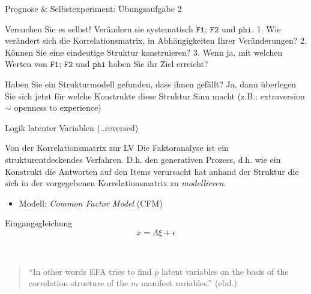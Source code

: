 \documentclass[
  ignorenonframetext,
]{beamer}
\providecommand{\tightlist}{%
  \setlength{\itemsep}{0pt}\setlength{\parskip}{0pt}}
\begin{document}
\begin{frame}{Prognose \& Selbstexperiment: Übungsaufgabe 2}
\protect\hypertarget{prognose-selbstexperiment-uxfcbungsaufgabe-2}{}
\begin{example}
Versuchen Sie es selbst! Verändern sie systematisch $\texttt{F1; F2}$  und
$\texttt{phi}$.
1. Wie verändert sich die Korrelationsmatrix, in Abhängigkeiten
Ihrer Veränderungen? 
2. Können Sie eine eindeutige Struktur konstruieren? 
3. Wenn ja, mit welchen Werten von $\texttt{F1; F2}$  und $\texttt{phi}$ haben Sie ihr Ziel
erreicht?
\end{example}

\begin{example}
Haben Sie ein Strukturmodell gefunden, dass ihnen gefällt? Ja, dann überlegen
Sie sich jetzt für welche Konstrukte diese Struktur Sinn macht (z.B.:
extraversion $\sim$ openness to experience)
\end{example}
\end{frame}

\begin{frame}{Logik latenter Variablen (..reversed)}
\protect\hypertarget{logik-latenter-variablen-..reversed}{}
\begin{block}{Von der Korrelationsmatrix zur LV} Die Faktoranalyse
ist ein strukturentdeckendes Verfahren. D.h. den generativen Prozess, d.h. wie
ein Konstrukt die Antworten auf den Items verursacht hat anhand der Struktur die
sich in der vorgegebenen Korrelationsmatrix zu \textit{modellieren}.
\end{block}

\begin{itemize}
\tightlist
\item
  Modell: \emph{Common Factor Model} (CFM)
\end{itemize}

\begin{alertblock}{Eingangsgleichung}
  \begin{equation}
    x = \Lambda \xi + \epsilon
  \end{equation}
\end{alertblock}

~

\begin{quote}
``In other words EFA tries to find \(p\) latent variables on the basis
of the correlation structure of the \(m\) manifest variables.'' (ebd.)
\end{quote}
\end{frame}
\end{document}
